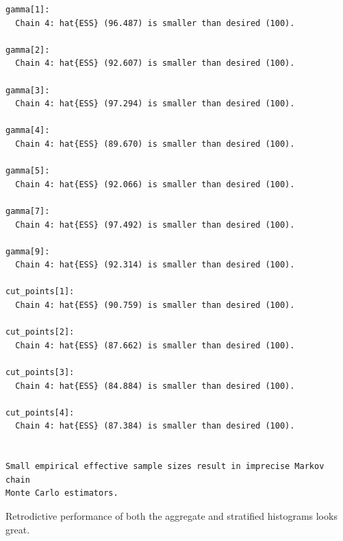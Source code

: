 \documentclass[
  letterpaper,
  DIV=11,
  numbers=noendperiod]{scrartcl}
\newenvironment{Shaded}{\begin{snugshade}}{\end{snugshade}}
\newcommand{\AttributeTok}[1]{\textcolor[rgb]{0.40,0.45,0.13}{#1}}
\newcommand{\ConstantTok}[1]{\textcolor[rgb]{0.56,0.35,0.01}{#1}}
\newcommand{\FunctionTok}[1]{\textcolor[rgb]{0.28,0.35,0.67}{#1}}
\newcommand{\NormalTok}[1]{\textcolor[rgb]{0.00,0.23,0.31}{#1}}
\newcommand{\OtherTok}[1]{\textcolor[rgb]{0.00,0.23,0.31}{#1}}
\newcommand{\SpecialCharTok}[1]{\textcolor[rgb]{0.37,0.37,0.37}{#1}}
\newcommand{\StringTok}[1]{\textcolor[rgb]{0.13,0.47,0.30}{#1}}
\begin{document}
\begin{Shaded}
\end{Shaded}

\begin{verbatim}
gamma[1]:
  Chain 4: hat{ESS} (96.487) is smaller than desired (100).

gamma[2]:
  Chain 4: hat{ESS} (92.607) is smaller than desired (100).

gamma[3]:
  Chain 4: hat{ESS} (97.294) is smaller than desired (100).

gamma[4]:
  Chain 4: hat{ESS} (89.670) is smaller than desired (100).

gamma[5]:
  Chain 4: hat{ESS} (92.066) is smaller than desired (100).

gamma[7]:
  Chain 4: hat{ESS} (97.492) is smaller than desired (100).

gamma[9]:
  Chain 4: hat{ESS} (92.314) is smaller than desired (100).

cut_points[1]:
  Chain 4: hat{ESS} (90.759) is smaller than desired (100).

cut_points[2]:
  Chain 4: hat{ESS} (87.662) is smaller than desired (100).

cut_points[3]:
  Chain 4: hat{ESS} (84.884) is smaller than desired (100).

cut_points[4]:
  Chain 4: hat{ESS} (87.384) is smaller than desired (100).


Small empirical effective sample sizes result in imprecise Markov chain
Monte Carlo estimators.
\end{verbatim}

Retrodictive performance of both the aggregate and stratified histograms
looks great.
\end{document}
